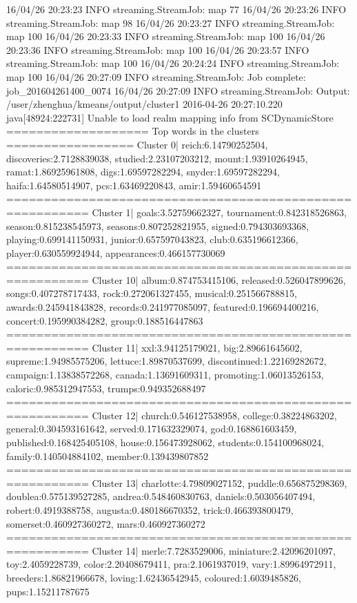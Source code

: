 16/04/26 20:23:23 INFO streaming.StreamJob:  map 77%
16/04/26 20:23:26 INFO streaming.StreamJob:  map 98%
16/04/26 20:23:27 INFO streaming.StreamJob:  map 100%
16/04/26 20:23:33 INFO streaming.StreamJob:  map 100%
16/04/26 20:23:36 INFO streaming.StreamJob:  map 100%
16/04/26 20:23:57 INFO streaming.StreamJob:  map 100%
16/04/26 20:24:24 INFO streaming.StreamJob:  map 100%
16/04/26 20:27:09 INFO streaming.StreamJob: Job complete: job_201604261400_0074
16/04/26 20:27:09 INFO streaming.StreamJob: Output: /user/zhenghua/kmeans/output/cluster1
2016-04-26 20:27:10.220 java[48924:222731] Unable to load realm mapping info from SCDynamicStore
=================== Top words in the clusters ================= 
Cluster 0| reich:6.14790252504, discoveries:2.7128839038, studied:2.23107203212, mount:1.93910264945, ramat:1.86925961808, digs:1.69597282294, snyder:1.69597282294, haifa:1.64580514907, pcs:1.63469220843, amir:1.59460654591
========================================================= 
Cluster 1| goals:3.52759662327, tournament:0.842318526863, season:0.815238545973, seasons:0.807252821955, signed:0.794303693368, playing:0.699141150931, junior:0.657597043823, club:0.635196612366, player:0.630559924944, appearances:0.466157730069
========================================================= 
Cluster 10| album:0.874753415106, released:0.526047899626, songs:0.407278717433, rock:0.272061327455, musical:0.251566788815, awards:0.245941843828, records:0.241977085097, featured:0.196694400216, concert:0.195990384282, group:0.188516447863
========================================================= 
Cluster 11| xxl:3.94125179021, big:2.89661645602, supreme:1.94985575206, lettuce:1.89870537699, discontinued:1.22169282672, campaign:1.13838572268, canada:1.13691609311, promoting:1.06013526153, caloric:0.985312947553, trumps:0.949352688497
========================================================= 
Cluster 12| church:0.546127538958, college:0.38224863202, general:0.304593161642, served:0.171632329074, god:0.168861603459, published:0.168425405108, house:0.156473928062, students:0.154100968024, family:0.140504884102, member:0.139439807852
========================================================= 
Cluster 13| charlotte:4.79809027152, puddle:0.656875298369, doublea:0.575139527285, andrea:0.548460830763, daniels:0.503056407494, robert:0.4919388758, augusta:0.480186670352, trick:0.466393800479, somerset:0.460927360272, mars:0.460927360272
========================================================= 
Cluster 14| merle:7.7283529006, miniature:2.42096201097, toy:2.4059228739, color:2.20408679411, pra:2.1061937019, vary:1.89964972911, breeders:1.86821966678, loving:1.62436542945, coloured:1.6039485826, pups:1.15211787675
